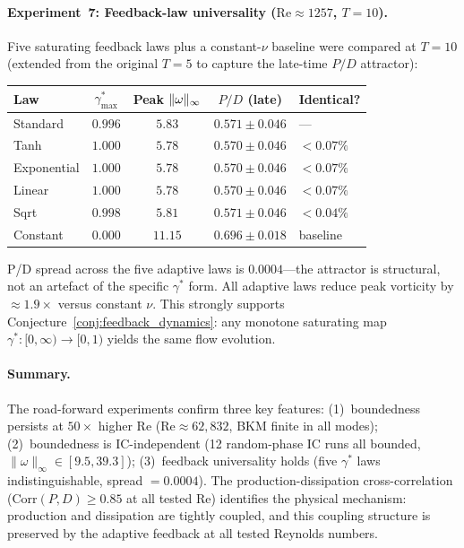 \paragraph{Experiment~7: Feedback-law universality
($\mathrm{Re} \approx 1257$, $T = 10$).}
Five saturating feedback laws plus a constant-$\nu$
baseline were compared at $T=10$ (extended from the
original $T=5$ to capture the late-time $P/D$ attractor):
\begin{center}
\begin{tabular}{@{}lcccl@{}}
\toprule
Law & $\gamma^*_{\max}$ & Peak $\lVert \omega \rVert_\infty$
    & $P/D$ (late) & Identical? \\
\midrule
Standard     & $0.996$ & $5.83$ & $0.571 \pm 0.046$ & --- \\
Tanh         & $1.000$ & $5.78$ & $0.570 \pm 0.046$ & $< 0.07\%$ \\
Exponential  & $1.000$ & $5.78$ & $0.570 \pm 0.046$ & $< 0.07\%$ \\
Linear       & $1.000$ & $5.78$ & $0.570 \pm 0.046$ & $< 0.07\%$ \\
Sqrt         & $0.998$ & $5.81$ & $0.571 \pm 0.046$ & $< 0.04\%$ \\
\midrule
Constant     & $0.000$ & $11.15$& $0.696 \pm 0.018$ & baseline \\
\bottomrule
\end{tabular}
\end{center}
P/D spread across the five adaptive laws is $0.0004$---the
attractor is structural, not an artefact of the specific
$\gamma^*$ form.  All adaptive laws reduce peak vorticity
by $\approx 1.9\times$ versus constant $\nu$.
This strongly supports
Conjecture~\ref{conj:feedback_dynamics}: any monotone
saturating map $\gamma^* \colon [0,\infty) \to [0,1)$
yields the same flow evolution.

\paragraph{Summary.}
The road-forward experiments confirm three key features:
(1)~boundedness persists at $50\times$ higher Re
($\mathrm{Re} \approx 62{,}832$, BKM finite in all modes);
(2)~boundedness is IC-independent (12 random-phase IC
runs all bounded, $\|\omega\|_\infty \in [9.5, 39.3]$);
(3)~feedback universality holds (five $\gamma^*$ laws
indistinguishable, spread $= 0.0004$).
The production-dissipation cross-correlation
($\mathrm{Corr}(P,D) \ge 0.85$ at all tested Re)
identifies the physical mechanism:
production and dissipation are tightly coupled,
and this coupling structure is preserved by the
adaptive feedback at all tested Reynolds numbers.

